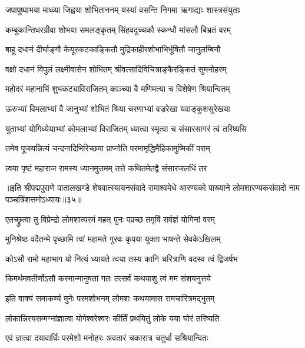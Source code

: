 \twolineshloka
{जपापुष्पाभया माध्व्या जिह्वया शोभिताननम्}
{यस्यां वसन्ति निगमा ऋगाद्याः शास्त्रसंयुताः}%

\twolineshloka
{कम्बुकान्तिधरग्रीवा शोभया समलङ्कृतम्}
{सिंहवदुच्चकौ स्कन्धौ मांसलौ बिभ्रतं वरम्}%

\twolineshloka
{बाहू दधानं दीर्घाङ्गौ केयूरकटकाङ्कितौ}
{मुद्रिकाहीरशोभाभिर्भूषितौ जानुलम्बिनौ}%

\twolineshloka
{वक्षो दधानं विपुलं लक्ष्मीवासेन शोभितम्}
{श्रीवत्सादिविचित्राङ्कैरङ्कितं सुमनोहरम्}%

\twolineshloka
{महोदरं महानाभिं शुभकट्याविराजितम्}
{काञ्च्या वै मणिमत्या च विशेषेण श्रियान्वितम्}%

\twolineshloka
{ऊरुभ्यां विमलाभ्यां वै जानुभ्यां शोभितं श्रिया}
{चरणाभ्यां वज्ररेखा यवाङ्कुशसुरेखया}%

\twolineshloka
{युताभ्यां योगिध्येयाभ्यां कोमलाभ्यां विराजितम्}
{ध्यात्वा स्मृत्वा च संसारसागरं त्वं तरिष्यसि}%

\twolineshloka
{तमेव पूजयन्नित्यं चन्दनादिभिरिच्छया}
{प्राप्नोति परमामृद्धिमैहिकामुष्मिकीं पराम्}%

\twolineshloka
{त्वया पृष्टं महाराज रामस्य ध्यानमुत्तमम्}
{तत्ते कथितमेतद्वै संसारजलधिं तर}%

॥इति श्रीपद्मपुराणे पातालखण्डे शेषवात्स्यायनसंवादे रामाश्वमेधे आरण्यको पाख्याने लोमशारण्यकसंवादो नाम पञ्चत्रिंशत्तमोऽध्यायः॥३५॥



\twolineshloka
{एतच्छ्रुत्वा तु विप्रेन्द्रो लोमशात्परमं महत्}
{पुनः पप्रच्छ तमृषिं सर्वज्ञं योगिनां वरम्}%


\twolineshloka
{मुनिश्रेष्ठ वदैतन्मे पृच्छामि त्वां महामते}
{गुरवः कृपया युक्ता भाषन्ते सेवकेऽखिलम्}%

\twolineshloka
{कोऽसौ रामो महाभाग यो नित्यं ध्यायते त्वया}
{तस्य कानि चरित्राणि वदस्व त्वं द्विजर्षभ}%

\twolineshloka
{किमर्थमवतीर्णोऽसौ कस्मान्मानुषतां गतः}
{तत्सर्वं कथयाशु त्वं मम संशयनुत्तये}%


\twolineshloka
{इति वाक्यं समाकर्ण्य मुनेः परमशोभनम्}
{लोमशः कथयामास रामचारित्रमद्भुतम्}%

\twolineshloka
{लोकान्निरयसम्मग्नांज्ञात्वा योगेश्वरेश्वरः}
{कीर्तिं प्रथयितुं लोके यया घोरं तरिष्यति}%

\twolineshloka
{एवं ज्ञात्वा दयावार्धिः परमेशो मनोहरः}
{अवतारं चकारात्र चतुर्धा सश्रियान्वितः}%

